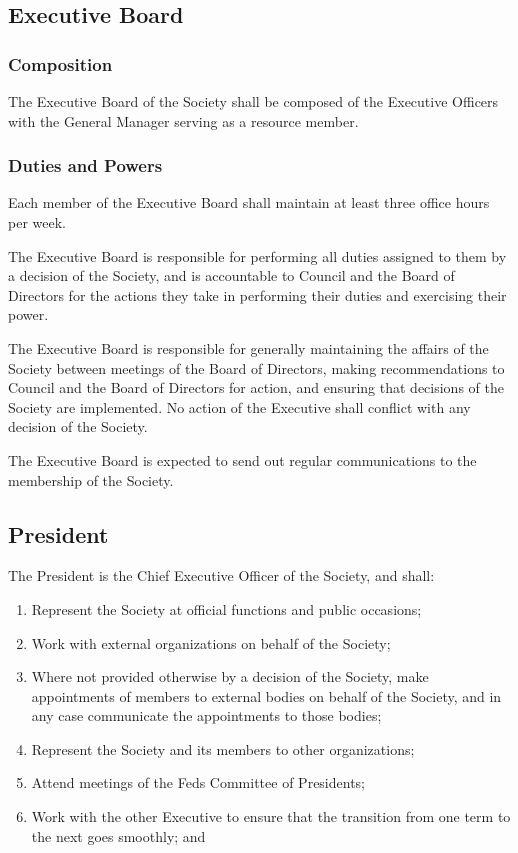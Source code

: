 \subsection{Executive Board}

\subsubsection{Composition}
The Executive Board of the Society shall be composed of the Executive Officers
with the General Manager serving as a resource member.

\subsubsection{Duties and Powers}
Each member of the Executive Board shall maintain at least three office hours
per week.

The Executive Board is responsible for performing all duties assigned to them
by a decision of the Society, and is accountable to Council and the
Board of Directors for the actions they take in performing their duties and
exercising their power.

The Executive Board is responsible for generally maintaining the affairs of the
Society between meetings of the Board of Directors, making recommendations to
Council and the Board of Directors for action, and ensuring that
decisions of the Society are implemented.  No action of the Executive shall
conflict with any decision of the Society.

The Executive Board is expected to send out regular communications to the
membership of the Society.

\subsection{President}
The President is the Chief Executive Officer of the Society, and shall:
\begin{enumerate}
  \item Represent the Society at official functions and public occasions;
  \item Work with external organizations on behalf of the Society;
  \item Where not provided otherwise by a decision of the Society, make
    appointments of members to external bodies on behalf of the Society, and in
    any case communicate the appointments to those bodies;
  \item Represent the Society and its members to other organizations;
  \item Attend meetings of the Feds Committee of Presidents;
  \item Work with the other Executive to ensure that the transition from one
    term to the next goes smoothly; and
\end{enumerate}

